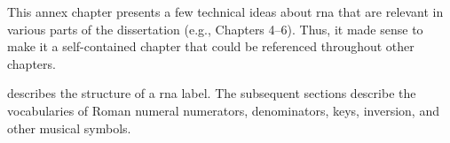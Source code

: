 
This annex chapter presents a few technical ideas about
\gls{rna} that are relevant in various parts of the
dissertation (e.g., Chapters 4--6). Thus, it made sense to
make it a self-contained chapter that could be referenced
throughout other chapters.

 describes
the structure of a \gls{rna} label. The subsequent sections
describe the vocabularies of Roman numeral numerators,
denominators, keys, inversion, and other musical symbols.
